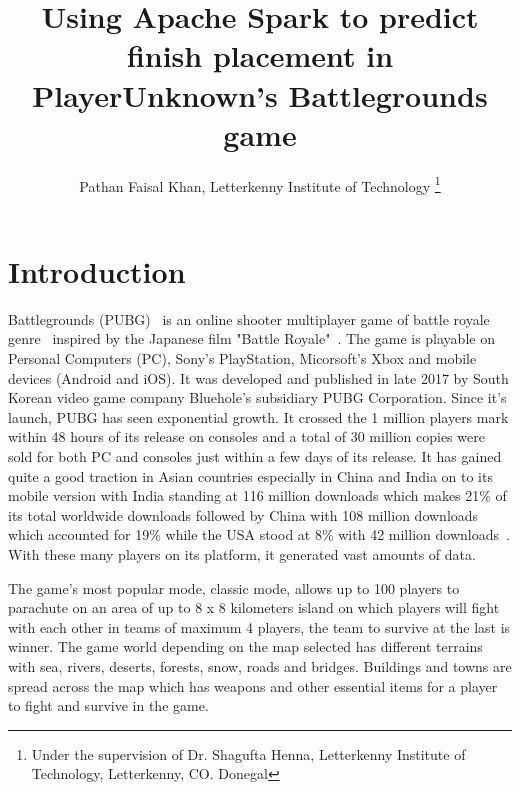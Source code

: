 \documentclass[journal,twoside,web]{ieeecolor}
\begin{document}
\title{Using Apache Spark to predict finish placement in PlayerUnknown’s Battlegrounds game}
\author{Pathan Faisal Khan, Letterkenny Institute of Technology
\thanks{Under the supervision of Dr. Shagufta Henna, Letterkenny Institute of Technology, Letterkenny, CO. Donegal}
}

\IEEEtitleabstractindextext{
\begin{abstract}

\end{abstract}

\begin{IEEEkeywords}

\end{IEEEkeywords}}

\maketitle

\section{Introduction}
\label{sec:introduction}
 Battlegrounds (PUBG)~\cite{noauthor_playerunknowns_nodate} is an online shooter multiplayer game of battle royale genre~\cite{noauthor_battle_2019} inspired by the Japanese film "Battle Royale"~\cite{fukasaku_battle_2000}. The game is playable on Personal Computers (PC), Sony's PlayStation, Micorsoft's Xbox and mobile devices (Android and iOS). It was developed and published in late 2017 by South Korean video game company Bluehole's subsidiary PUBG Corporation. Since it's launch, PUBG has seen exponential growth. It crossed the 1 million players mark within 48 hours of its release on consoles and a total of 30 million copies were sold for both PC and consoles just within a few days of its release. It has gained quite a good traction in Asian countries especially in China and India on to its mobile version with India standing at 116 million downloads which makes 21\% of its total worldwide downloads followed by China with 108 million downloads which accounted for 19\% while the USA stood at 8\% with 42 million downloads~\cite{mcaloon_now_nodate}. With these many players on its platform, it generated vast amounts of data.

The game's most popular mode, classic mode, allows up to 100 players to parachute on an area of up to 8 x 8 kilometers island on which players will fight with each other in teams of maximum 4 players, the team to survive at the last is winner. The game world depending on the map selected has different terrains with sea, rivers, deserts, forests, snow, roads and bridges. Buildings and towns are spread across the map which has weapons and other essential items for a player to fight and survive in the game.
\end{document}
